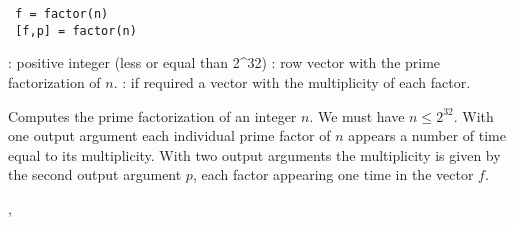 
\begin{mandesc}
\end{mandesc}

\begin{calling_sequence}
\begin{verbatim}
 f = factor(n)
 [f,p] = factor(n)
\end{verbatim}
\end{calling_sequence}

\begin{parameters}
  \begin{varlist}
   : positive integer (less or equal than 2^32)
   : row vector with the prime factorization of $n$.
   : if required a vector with the multiplicity of each factor.
  \end{varlist}
\end{parameters}

\begin{mandescription}
  Computes the prime factorization of an integer $n$. We must have $n
  \le 2^{32}$. With one output argument each individual prime factor
  of $n$ appears a number of time equal to its multiplicity. With two
  output arguments the multiplicity is given by the second output
  argument $p$, each factor appearing one time in the vector $f$.

\end{mandescription}

\begin{examples}
\begin{program}
\end{program}

\end{examples}


\begin{manseealso}
, 
\end{manseealso}


